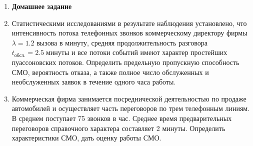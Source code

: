 \documentclass[a5paper,11pt]{extarticle}
\begin{document}
\begin{enumerate}
    \medskip
    \item[] \textbf{Домашнее задание}
    
    \item Статистическими исследованиями в результате наблюдения установлено, что интенсивность потока телефонных звонков коммерческому директору фирмы $\lambda = 1.2$ вызова в минуту, средняя продолжительность разговора $t_\text{обсл.} = 2.5\;\text{минуты}$ и все потоки событий имеют характер простейших пуассоновских потоков. 
    Определить предельную пропускную способность СМО, вероятность отказа, а также полное число обслуженных и необслуженных заявок в течение одного часа работы.
    
    \item Коммерческая фирма занимается посреднической деятельностью по продаже автомобилей и осуществляет часть переговоров по трем телефонным линиям. В среднем поступает 75 звонков в час. Среднее время предварительных переговоров справочного характера составляет 2 минуты. Определить характеристики СМО, дать оценку работы СМО.


\end{enumerate}
\newpage
\end{document}
